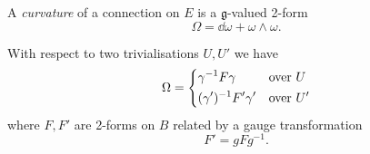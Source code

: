\documentclass[a4paper,11pt]{article}
\begin{document}
    \begin{defi}[Curvature]
        A \emph{curvature} of a connection on $E$ is a $\mathfrak{g}$-valued 2-form 
        \begin{equation}
            \Omega = \dd{\omega} + \omega \wedge \omega.
        \end{equation}
    \end{defi}

    With respect to two trivialisations $U, U'$ we have 
    \begin{equation}
        \Omega = \begin{dcases}
            \gamma^{-1} F \gamma & \text{over }U\\
            (\gamma')^{-1} F' \gamma' & \text{over }U'
        \end{dcases}
    \end{equation}
    where $F, F'$ are 2-forms on $B$ related by a gauge transformation 
    \begin{equation}
        F' = g F g^{-1}. \label{eq:curv-gauge-tfm}
    \end{equation}





    


    

\end{document}
